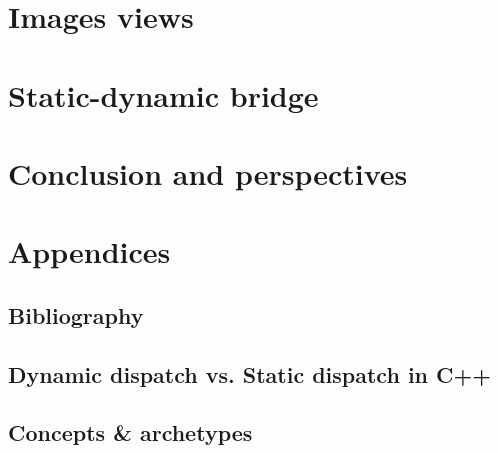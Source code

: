 \documentclass[11pt]{book}
\begin{document}


\cleardoublepage


\part{Images views}
\label{part.image_views}



\cleardoublepage


\part{Static-dynamic bridge}
\label{part.static_dynamic_bridge}



\cleardoublepage


\part{Conclusion and perspectives}
\label{part.conclusion_and_perspecitves}



\cleardoublepage


\part{Appendices}
\label{part.annexes}

\appendix

\chapter{Bibliography}
\label{chap.bibliography}

%
%
\printbibliography

\chapter{Dynamic dispatch vs. Static dispatch in C++}
\label{appendix.dispatch.dyn.static}



\chapter{Concepts \& archetypes}
\label{appendix.concepts.and.archetypes}


\end{document}
